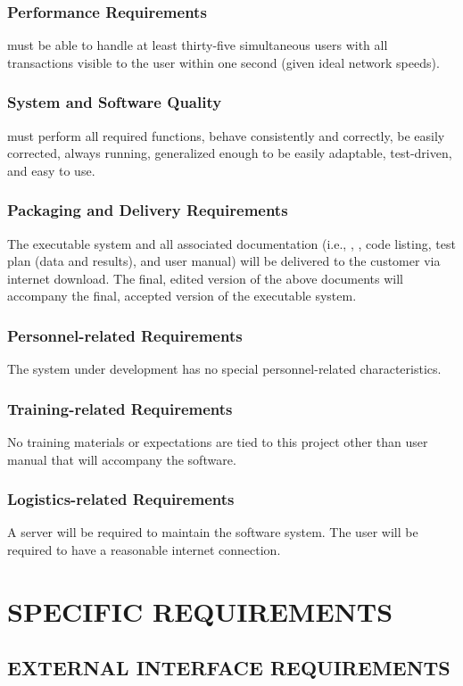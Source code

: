 \documentclass[12pt]{report}
\begin{document}
  \subsubsection{Performance Requirements}
    must be able to handle at least thirty-five simultaneous users with all transactions visible to the user within one second (given ideal network speeds).
  \subsubsection{System and Software Quality}
    must perform all required functions, behave consistently and correctly, be easily corrected, always running, generalized enough to be easily adaptable, test-driven, and easy to use.
  \subsubsection{Packaging and Delivery Requirements}
   The executable system and all associated documentation (i.e., , , code listing, test plan (data and results), and user manual) will be delivered to the customer via internet download. The final, edited version of the above documents will accompany the final, accepted version of the executable system.
  \subsubsection{Personnel-related Requirements}
   The system under development has no special personnel-related characteristics.
  \subsubsection{Training-related Requirements}
   No training materials or expectations are tied to this project other than user manual that will accompany the software.
  \subsubsection{Logistics-related Requirements}
   A server will be required to maintain the software system. The user will be required to have a reasonable internet connection.

\newpage
\section{SPECIFIC REQUIREMENTS}
 \subsection{EXTERNAL INTERFACE REQUIREMENTS}
\end{document}
